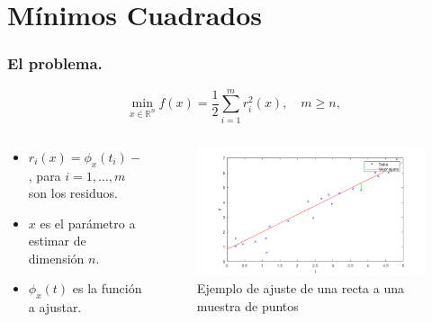 \documentclass{beamer}
\begin{document}
\section{Mínimos Cuadrados}

\begin{frame}
    \frametitle{El problema.}
    \begin{equation*}
        \min_{x\in \mathbb{R}^{n}}f(x) = \frac{1}{2}\sum_{i=1}^{m}r_i^2(x), \quad m\geq n,
    \end{equation*}
    \pause
\begin{columns}
    \begin{column}{0.4\textwidth}
        \begin{itemize}[label=\textbullet]
            \item $r_i(x) = \phi_x(t_i) - y_i$, para $i=1,\dots,m$ son los residuos. \pause
            \item $x$ es el parámetro a estimar de dimensión $n$. \pause
            \item $\phi_x(t)$ es la función a ajustar. \pause 
        \end{itemize}
    \end{column}
    \begin{column}{0.6\textwidth}  %
        \begin{figure}[h]
            \centering
            \includegraphics[width=1\textwidth]{imgs/examplelsqlin.png}
            \caption{Ejemplo de ajuste de una recta a una muestra de puntos}
        \end{figure}
    \end{column}
\end{columns}
\end{frame}
\end{document}
